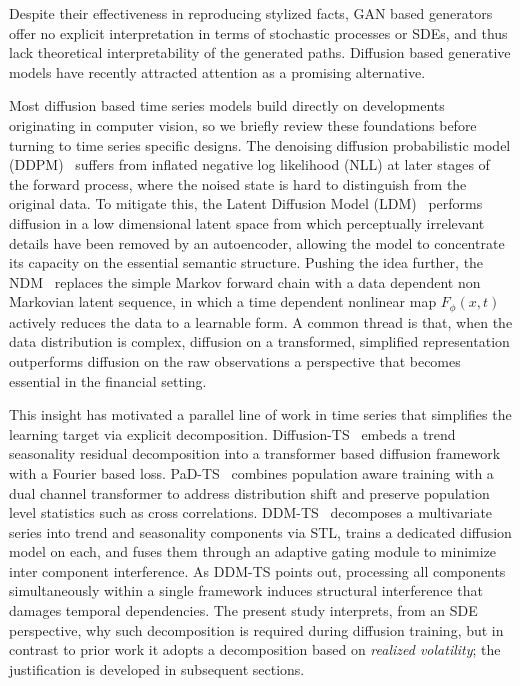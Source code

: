 \documentclass[sigconf,natbib=false]{acmart}
\begin{document}
Despite their effectiveness in reproducing stylized facts, GAN based generators offer no explicit interpretation in terms of stochastic processes or SDEs, and thus lack theoretical interpretability of the generated paths. Diffusion based generative models have recently attracted attention as a promising alternative.

Most diffusion based time series models build directly on developments originating in computer vision, so we briefly review these foundations before turning to time series specific designs. The denoising diffusion probabilistic model (DDPM)~\cite{DDPMHo20} suffers from inflated negative log likelihood (NLL) at later stages of the forward process, where the noised state is hard to distinguish from the original data. To mitigate this, the Latent Diffusion Model (LDM)~\cite{LDMRombach22} performs diffusion in a low dimensional latent space from which perceptually irrelevant details have been removed by an autoencoder, allowing the model to concentrate its capacity on the essential semantic structure. Pushing the idea further, the NDM~\cite{NDMBartosh23} replaces the simple Markov forward chain with a data dependent non Markovian latent sequence, in which a time dependent nonlinear map $F_\phi(x,t)$ actively reduces the data to a learnable form. A common thread is that, when the data distribution is complex, diffusion on a transformed, simplified representation outperforms diffusion on the raw observations a perspective that becomes essential in the financial setting.

This insight has motivated a parallel line of work in time series that simplifies the learning target via explicit decomposition. Diffusion-TS~\cite{DiffusionTSYuan24} embeds a trend seasonality residual decomposition into a transformer based diffusion framework with a Fourier based loss. PaD-TS~\cite{PaDTSLi25} combines population aware training with a dual channel transformer to address distribution shift and preserve population level statistics such as cross correlations. DDM-TS~\cite{DDMTSKim24} decomposes a multivariate series into trend and seasonality components via STL, trains a dedicated diffusion model on each, and fuses them through an adaptive gating module to minimize inter component interference. As DDM-TS points out, processing all components simultaneously within a single framework induces structural interference that damages temporal dependencies. The present study interprets, from an SDE perspective, why such decomposition is required during diffusion training, but in contrast to prior work it adopts a decomposition based on \emph{realized volatility}; the justification is developed in subsequent sections.
\end{document}

